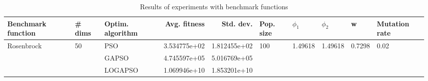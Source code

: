 \begin{table}
\centering
\caption{Results of experiments with benchmark functions}
\begin{tabular}{lllrrlllll}
\toprule
         Benchmark function &             \# dims & Optim. algorithm &  Avg. fitness &    Std. dev. &            Pop. size &               $\phi_{1}$ &               $\phi_{2}$ &                       w &         Mutation rate \\
\midrule
\multirow{3}{*}{Rosenbrock} & \multirow{3}{*}{50} &              PSO &  3.534775e+02 & 1.812455e+02 & \multirow{3}{*}{100} & \multirow{3}{*}{1.49618} & \multirow{3}{*}{1.49618} & \multirow{3}{*}{0.7298} & \multirow{3}{*}{0.02} \\
                            &                     &            GAPSO &  4.745597e+05 & 5.016769e+05 &                      &                          &                          &                         &                       \\
                            &                     &          LOGAPSO &  1.069946e+10 & 1.853201e+10 &                      &                          &                          &                         &                       \\
\bottomrule
\end{tabular}
\end{table}
